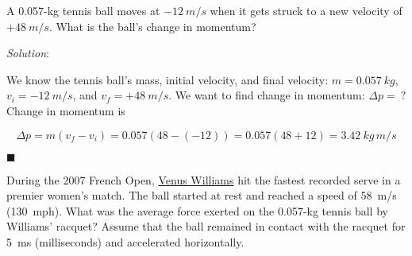 \documentclass[dvipsnames]{article}
\begin{document}
\begin{example}\label{EvkSMv}
A 0.057-kg tennis ball moves at $-\SI{12}{m/s}$ when it gets struck to a new velocity of $+\SI{48}{m/s}$. What is the ball's change in momentum?

\begin{center}
%
%
\end{center}
\end{example}

\textit{Solution}: 

We know the tennis ball's mass, initial velocity, and final velocity: $m = \SI{0.057}{kg}$, $v_i = -\SI{12}{m/s}$, and $v_f = +\SI{48}{m/s}$. We want to find change in momentum: $\Delta p =\ ?$ Change in momentum is

\begin{equation*}
    \Delta p  = m \left(v_f - v_i\right) = 0.057 \left(48 - \left(-12\right) \right) = 0.057 \left(48 + 12 \right) = \SI{3.42}{kg\,m/s}
\end{equation*}

\hfill $\blacksquare$

\begin{example}
During the 2007 French Open, \href{https://youtu.be/6b1NSgQZvdo}{Venus Williams} hit the fastest recorded serve in a premier women's match. The ball started at rest and reached a speed of \SI{58}{m/s} (\SI{130}{mph}). What was the average force exerted on the 0.057-kg tennis ball by Williams' racquet? Assume that the ball remained in contact with the racquet for \SI{5}{ms} (milliseconds) and accelerated horizontally.
\end{example}
\end{document}
